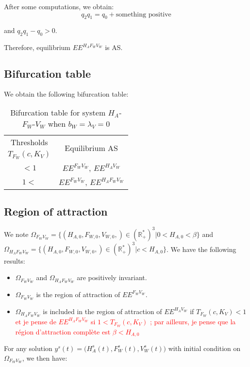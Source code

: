 \documentclass{article}
\newcommand{\lvw}{\lambda_{V}}
\newcommand{\marc}[1]{\textcolor{red}{#1}}
\begin{document}
\begin{itemize}
After some computations, we obtain:
$$
q_2 q_1 = q_0 + \text{something positive}
$$

and $q_2 q_1 - q_0 > 0$.

Therefore, equilibrium $EE^{H_AF_WV_W}$ is AS.

\end{itemize}

\subsection{Bifurcation table}
We obtain the following bifurcation table:
\begin{table}[!ht]
\centering
\caption{Bifurcation table for system $H_A$- $F_W$-$V_W$ when $b_W = \lvw = 0$}
\label{modelHAFWVW:bifurcation table, case0}
\begin{tabular}{c|c}
Thresholds & \multirow{2}{*}{Equilibrium AS}\\
$T_{F_W}(c, K_V)$  &\\
 \hline
$<1$ & $EE^{F_WV_W}$, $EE^{H_AV_W}$\\
\hline
$1 < $ & $EE^{F_WV_W}$, $EE^{H_AF_WV_W}$
\end{tabular}
\end{table}


\subsection{Region of attraction}
We note $\Omega_{F_WV_W} = \Big\{(H_{A, 0}, F_{W,0}, V_{W, 0},) \in (\mathbb{R}_+^*)^3 | 0 < H_{A, 0} < \beta\Big\}$ and $\Omega_{H_AF_WV_W} = \Big\{(H_{A, 0}, F_{W,0}, V_{W, 0},) \in (\mathbb{R}_+^*)^3 | c < H_{A, 0} \Big\}$. We have the following results:
\begin{itemize}
\item $\Omega_{F_WV_W}$ and $\Omega_{H_AF_WV_W}$ are positively invariant.
\item $\Omega_{F_WV_W}$ is the region of attraction of $EE^{F_WV_W}$.
\item $\Omega_{H_AF_WV_W}$ is included in the region of attraction of $EE^{H_AV_W}$ if $T_{F_W}(c, K_V) < 1$ \marc{et je pense de $EE^{H_AF_WV_W}$ si $1 < T_{F_W}(c, K_V)$ ; par ailleurs, je pense que la région d'attraction complète est $ \beta < H_{A, 0}$}
\end{itemize}

For any solution $y^s(t) = \Big(H_A^s(t), F_W^s(t), V_W^s(t)\Big)$ with initial condition on $\Omega_{F_WV_W}$, we then have:
\end{document}
